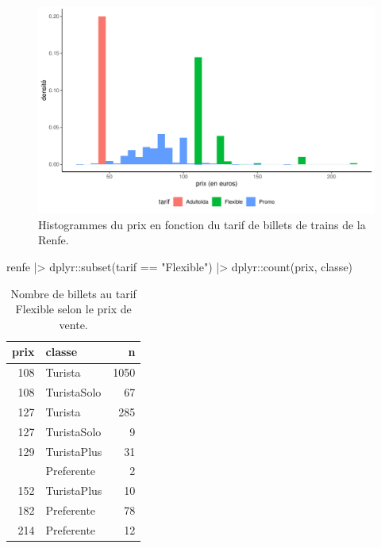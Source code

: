 \documentclass[
  11pt,
  letterpaper,
]{scrbook}
\newenvironment{Shaded}{\begin{snugshade}}{\end{snugshade}}
\newcommand{\FunctionTok}[1]{\textcolor[rgb]{0.28,0.35,0.67}{#1}}
\newcommand{\NormalTok}[1]{\textcolor[rgb]{0.00,0.23,0.31}{#1}}
\newcommand{\SpecialCharTok}[1]{\textcolor[rgb]{0.37,0.37,0.37}{#1}}
\newcommand{\StringTok}[1]{\textcolor[rgb]{0.13,0.47,0.30}{#1}}
\theoremstyle{definition}
\theoremstyle{remark}
\begin{document}
\begin{figure}[ht!]

{\centering \includegraphics[width=1\textwidth,height=\textheight]{./01-analyseexploratoire_files/figure-pdf/fig-renfe-aed7-1.pdf}

}

\caption{\label{fig-renfe-aed7}Histogrammes du prix en fonction du tarif
de billets de trains de la Renfe.}

\end{figure}

\begin{Shaded}
\begin{Highlighting}[]
\NormalTok{renfe }\SpecialCharTok{|\textgreater{}}
\NormalTok{  dplyr}\SpecialCharTok{::}\FunctionTok{subset}\NormalTok{(tarif  }\SpecialCharTok{==} \StringTok{"Flexible"}\NormalTok{) }\SpecialCharTok{|\textgreater{}}
\NormalTok{  dplyr}\SpecialCharTok{::}\FunctionTok{count}\NormalTok{(prix, classe)}
\end{Highlighting}
\end{Shaded}

\hypertarget{tbl-renfeaedrep}{}
\begin{table}
\caption{\label{tbl-renfeaedrep}Nombre de billets au tarif Flexible selon le prix de vente. }\tabularnewline

\centering
\begin{tabular}[t]{rlr}
\toprule
prix & classe & n\\
\midrule
108 & Turista & 1050\\
108 & TuristaSolo & 67\\
127 & Turista & 285\\
127 & TuristaSolo & 9\\
129 & TuristaPlus & 31\\
\addlinespace
140 & Preferente & 2\\
152 & TuristaPlus & 10\\
182 & Preferente & 78\\
214 & Preferente & 12\\
\bottomrule
\end{tabular}
\end{table}
\end{document}
